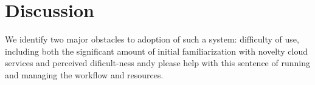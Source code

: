 \documentclass[a4paper, 10pt, conference]{ieeeconf}
\makeatletter
\newcommand{\specialcell}[2][c]{%
  \begin{tabular}[#1]{@{}c@{}}#2\end{tabular}}
\makeatother
\begin{document}

\section{Discussion}

We identify two major obstacles to adoption of such a system: difficulty of use, including both the significant amount of initial familiarization with novelty cloud services and perceived dificult-ness {\color{red} andy please help with this sentence} of running and managing the workflow and resources. 
\end{document}

